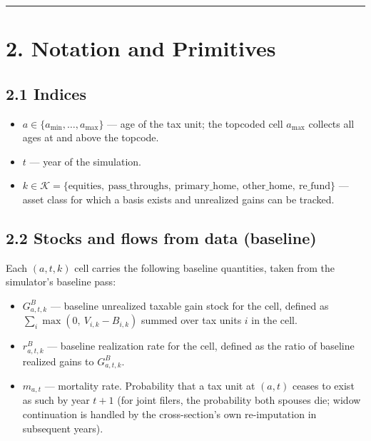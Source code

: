 \documentclass[11pt]{article}
\begin{document}
\par\medskip\hrule\medskip

\section*{2. Notation and Primitives}

\subsection*{2.1 Indices}

\begin{itemize}
  \item $a \in \{a_{\min}, \ldots, a_{\max}\}$ — age of the tax unit; the topcoded
    cell $a_{\max}$ collects all ages at and above the topcode.
\end{itemize}
\begin{itemize}
  \item $t$ — year of the simulation.
\end{itemize}
\begin{itemize}
  \item $k \in \mathcal{K} = \{\text{equities},\ \text{pass\_throughs},\
  \text{primary\_home},\ \text{other\_home},\ \text{re\_fund}\}$ — asset
    class for which a basis exists and unrealized gains can be tracked.
\end{itemize}

\subsection*{2.2 Stocks and flows from data (baseline)}

Each $(a, t, k)$ cell carries the following baseline quantities, taken from the simulator's baseline pass:

\begin{itemize}
  \item $G^B_{a,t,k}$ — baseline unrealized taxable gain stock for the cell, defined
    as $\sum_i \max(0,\ V_{i,k} - B_{i,k})$ summed over tax units $i$ in the
    cell.
\end{itemize}
\begin{itemize}
  \item $r^B_{a,t,k}$ — baseline realization rate for the cell, defined as the
    ratio of baseline realized gains to $G^B_{a,t,k}$.
\end{itemize}
\begin{itemize}
  \item $m_{a,t}$ — mortality rate. Probability that a tax unit at $(a, t)$ ceases
    to exist as such by year $t+1$ (for joint filers, the probability both
    spouses die; widow continuation is handled by the cross-section's own
    re-imputation in subsequent years).
\end{itemize}
\end{document}
